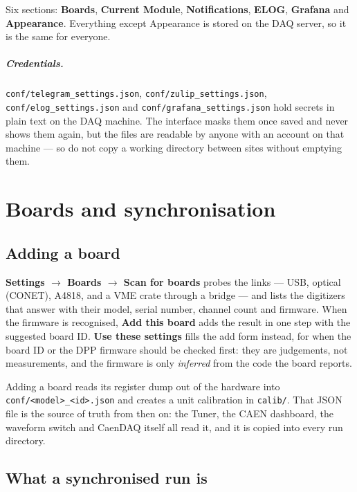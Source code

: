 \documentclass[11pt,a4paper]{report}
\newcommand{\ui}[1]{\textbf{#1}}          %
\newcommand{\file}[1]{\texttt{#1}}
\begin{document}
Six sections: \ui{Boards}, \ui{Current Module}, \ui{Notifications}, \ui{ELOG},
\ui{Grafana} and \ui{Appearance}. Everything except Appearance is stored on the
DAQ server, so it is the same for everyone.

\paragraph{Credentials.} \file{conf/telegram\_settings.json},
\file{conf/zulip\_settings.json}, \file{conf/elog\_settings.json} and
\file{conf/grafana\_settings.json} hold secrets in plain text on the DAQ machine.
The interface masks them once saved and never shows them again, but the files are
readable by anyone with an account on that machine --- so do not copy a working
directory between sites without emptying them.

\chapter{Boards and synchronisation}
\label{ch:boards}

\section{Adding a board}

\ui{Settings $\rightarrow$ Boards $\rightarrow$ Scan for boards} probes the links
--- USB, optical (CONET), A4818, and a VME crate through a bridge --- and lists
the digitizers that answer with their model, serial number, channel count and
firmware. When the firmware is recognised, \ui{Add this board} adds the result in
one step with the suggested board ID. \ui{Use these settings} fills the add form
instead, for when the board ID or the DPP firmware should be checked first: they
are judgements, not measurements, and the firmware is only \emph{inferred} from
the code the board reports.

Adding a board reads its register dump out of the hardware into
\file{conf/<model>\_<id>.json} and creates a unit calibration in \file{calib/}.
That JSON file is the source of truth from then on: the Tuner, the CAEN
dashboard, the waveform switch and CaenDAQ itself all read it, and it is copied
into every run directory.

\section{What a synchronised run is}
\end{document}
